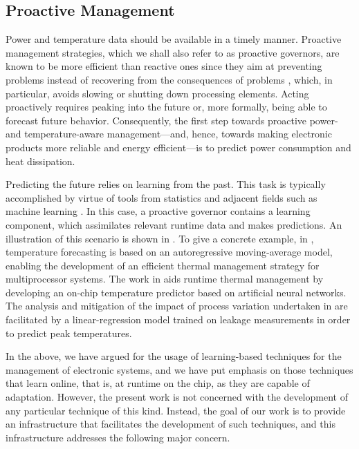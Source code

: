 \subsection{Proactive Management}

Power and temperature data should be available in a timely manner. Proactive
management strategies, which we shall also refer to as proactive governors, are
known to be more efficient than reactive ones since they aim at preventing
problems instead of recovering from the consequences of problems
\cite{coskun2008, chaudhry2015}, which, in particular, avoids slowing or
shutting down processing elements. Acting proactively requires peaking into the
future or, more formally, being able to forecast future behavior. Consequently,
the first step towards proactive power- and temperature-aware management---and,
hence, towards making electronic products more reliable and energy
efficient---is to predict power consumption and heat dissipation.

Predicting the future relies on learning from the past. This task is typically
accomplished by virtue of tools from statistics and adjacent fields such as
machine learning \cite{bishop2006}. In this case, a proactive governor contains
a learning component, which assimilates relevant runtime data and makes
predictions. An illustration of this scenario is shown in . To
give a concrete example, in \cite{coskun2008}, temperature forecasting is based
on an autoregressive moving-average model, enabling the development of an
efficient thermal management strategy for multiprocessor systems. The work in
\cite{kumar2010} aids runtime thermal management by developing an on-chip
temperature predictor based on artificial neural networks. The analysis and
mitigation of the impact of process variation undertaken in \cite{juan2014} are
facilitated by a linear-regression model trained on leakage measurements in
order to predict peak temperatures.

In the above, we have argued for the usage of learning-based techniques for the
management of electronic systems, and we have put emphasis on those techniques
that learn online, that is, at runtime on the chip, as they are capable of
adaptation. However, the present work is not concerned with the development of
any particular technique of this kind. Instead, the goal of our work is to
provide an infrastructure that facilitates the development of such techniques,
and this infrastructure addresses the following major concern.

